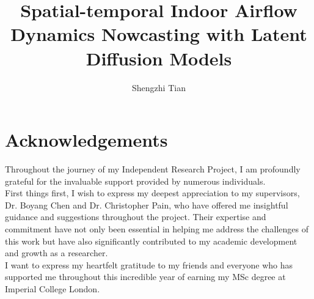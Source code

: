 \documentclass[final-report]{article-template}
\title{Spatial-temporal Indoor Airflow Dynamics Nowcasting with Latent Diffusion Models}
\author{Shengzhi Tian}
\begin{document}
\maketitlepage
\section*{Acknowledgements}

Throughout the journey of my Independent Research Project, I am profoundly grateful for the invaluable support provided by numerous individuals.\\

First things first, I wish to express my deepest appreciation to my supervisors, Dr. Boyang Chen and Dr. Christopher Pain, who have offered me insightful guidance and suggestions throughout the project. Their expertise and commitment have not only been essential in helping me address the challenges of this work but have also significantly contributed to my academic development and growth as a researcher. \\

I want to express my heartfelt gratitude to my friends and everyone who has supported me throughout this incredible year of earning my MSc degree at Imperial College London.
\newpage
\tableofcontents
	
\end{document}
